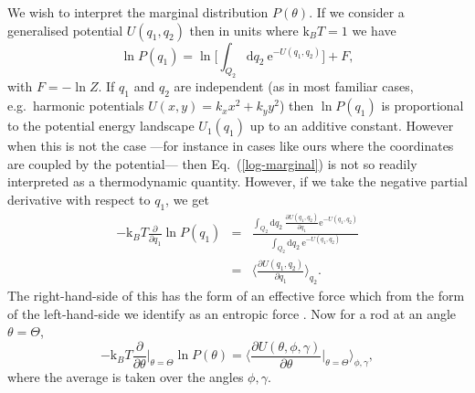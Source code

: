 \documentclass[aps,prl,reprint,twocolumn,superscriptaddress,showpacs]{revtex4-1}
\newcommand{\dd}{\mathrm{d}}
\newcommand{\ee}{\mathrm{e}}
\newcommand{\kk}{\mathrm{k}_B}
\begin{document}
 
%
%
%
%
%
%
%
 We wish to interpret the marginal distribution $P(\theta)$. If we consider a generalised potential $U(q_1,q_2)$ then in units where $\kk T=1$ we have
\begin{equation}\label{log-marginal}
\ln{P(q_1)} = \ln\Big[ \int_{Q_2} \dd q_2\ \ee^{-U(q_1,q_2)} \Big] + F,
\end{equation}with $F=-\ln Z$. If $q_1$ and $q_2$ are independent (as in most familiar cases, e.g.\ harmonic potentials $U(x,y)= k_x x^2 + k_y y^2$) then $\ln P(q_1)$ is proportional to the potential energy landscape $U_1(q_1)$ up to an additive constant. However when this is not the case ---for instance in cases like ours where the coordinates are coupled by the potential--- then Eq.\ (\ref{log-marginal}) is not so readily interpreted as a thermodynamic quantity. However, if we take the negative partial derivative with respect to $q_1$, we get
\begin{eqnarray}
-\kk T\frac{\partial }{\partial q_1} \ln{P(q_1)} & = & \frac{\int_{Q_2} \dd q_2 \ \frac{\partial U(q_1,q_2)}{\partial q_1} \ee^{-U(q_1,q_2)} }{\int_{Q_2} \dd q_2 \  \ee^{-U(q_1,q_2)}}\nonumber \\ 
& = & \Big\langle \frac{\partial U(q_1,q_2)}{\partial q_1} \Big\rangle_{q_2}.
\end{eqnarray}
The right-hand-side of this has the form of an effective force which from the form of the left-hand-side we identify as an entropic force \cite{Neumann1980,Roos2014}. Now for a rod at an angle $\theta=\Theta$,
\begin{equation} \label{entropicforce}
-\kk T\frac{\partial }{\partial \theta}\Big|_{\theta=\Theta} \ln{P(\theta)}  = \Big\langle \frac{\partial U(\theta,\phi,\gamma)}{\partial \theta}\Big|_{\theta=\Theta} \Big\rangle_{\phi,\gamma},
\end{equation}where the average is taken over the angles $\phi,\gamma$.
\end{document}
